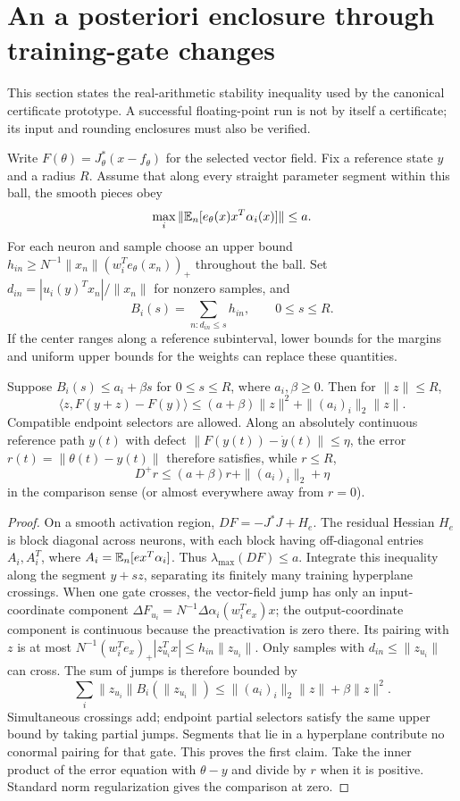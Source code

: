 \section{An a posteriori enclosure through training-gate changes}
This section states the real-arithmetic stability inequality used by the
canonical certificate prototype. A successful floating-point run is not by
itself a certificate; its input and rounding enclosures must also be verified.

Write $F(\theta)=J_\theta^*(x-f_\theta)$ for the selected vector field.
Fix a reference state $y$ and a radius $R$. Assume that along every straight
parameter segment within this ball, the smooth pieces obey
\[
 \max_i\|\mathbb E_n[e_\theta(x)x^T\alpha_i(x)]\|\le a.
\]
For each neuron and sample choose an upper bound
$h_{in}\ge N^{-1}\|x_n\|(w_i^Te_\theta(x_n))_+$ throughout the ball.
Set $d_{in}=|u_i(y)^Tx_n|/\|x_n\|$ for nonzero samples, and
\[
 B_i(s)=\sum_{n:d_{in}\le s}h_{in},\qquad 0\le s\le R.
\]
If the center ranges along a reference subinterval, lower bounds for the
margins and uniform upper bounds for the weights can replace these quantities.

\begin{lemma}\label{lem:tube}
Suppose $B_i(s)\le a_i+\beta s$ for $0\le s\le R$, where $a_i,\beta\ge0$.
Then for $\|z\|\le R$,
\[
 \langle z,F(y+z)-F(y)\rangle
 \le(a+\beta)\|z\|^2+\|(a_i)_i\|_2\|z\|.
\]
Compatible endpoint selectors are allowed. Along an absolutely continuous
reference path $y(t)$ with defect $\|F(y(t))-\dot y(t)\|\le\eta$, the
error $r(t)=\|\theta(t)-y(t)\|$ therefore satisfies, while $r\le R$,
\[
 D^+r\le(a+\beta)r+\|(a_i)_i\|_2+\eta
\]
in the comparison sense (or almost everywhere away from $r=0$).
\end{lemma}
\begin{proof}
On a smooth activation region,
$DF=-J^*J+H_e$. The residual Hessian $H_e$ is block diagonal across
neurons, with each block having off-diagonal entries $A_i,A_i^T$, where
$A_i=\mathbb E_n[e x^T\alpha_i]$. Thus $\lambda_{\max}(DF)\le a$.
Integrate this inequality along the segment $y+sz$, separating its finitely
many training hyperplane crossings. When one gate crosses, the vector-field
jump has only an input-coordinate component
$\Delta F_{u_i}=N^{-1}\Delta\alpha_i(w_i^Te_x)x$; the output-coordinate
component is continuous because the preactivation is zero there. Its pairing
with $z$ is at most
$N^{-1}(w_i^Te_x)_+|z_{u_i}^Tx|\le h_{in}\|z_{u_i}\|$.
Only samples with $d_{in}\le\|z_{u_i}\|$ can cross. The sum of jumps is
therefore bounded by
\[
 \sum_i\|z_{u_i}\|B_i(\|z_{u_i}\|)
 \le\|(a_i)_i\|_2\|z\|+\beta\|z\|^2.
\]
Simultaneous crossings add; endpoint partial selectors satisfy the same
upper bound by taking partial jumps. Segments that lie in a hyperplane
contribute no conormal pairing for that gate. This proves the first claim.
Take the inner product of the error equation with $\theta-y$ and divide
by $r$ when it is positive. Standard norm regularization gives the comparison
at zero.
\end{proof}

